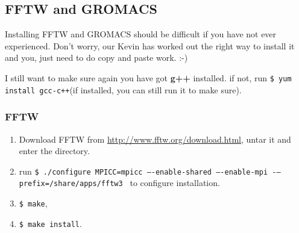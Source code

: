 \subsection{FFTW and GROMACS}
Installing FFTW and GROMACS should be difficult if you have not ever experienced. Don't worry, our Kevin has worked out the right way to install it and you, just need to do copy and paste work. :-)
\begin{remark}
I still want to make sure again you have got {\bf g++} installed. if not, run {\tt \$ yum install gcc-c++}(if installed, you can still run it to make sure).
\end{remark}
\subsubsection{FFTW}
\begin{enumerate}
\item Download FFTW from \url{http://www.fftw.org/download.html}, untar it and enter the directory. 
\item run {\tt\scriptsize \$ ./configure MPICC=mpicc –-enable-shared –-enable-mpi -–prefix=/share/apps/fftw3 } to configure installation.
\item {\tt \$ make},
\item {\tt \$ make install}.
\end{enumerate}
